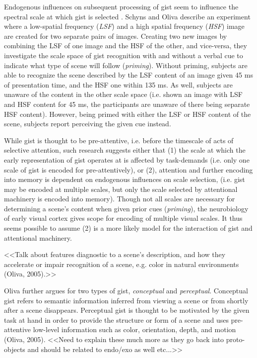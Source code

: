 \documentclass[a4paper,10pt,final]{ThesisStyle}
\begin{document}
Endogenous influences on subsequent processing of gist seem to influence the spectral scale at which gist is selected \cite{Schyns1994,Oliva1997}.  Schyns and Oliva describe an experiment where a low-spatial frequency (\textit{LSF}) and a high spatial frequency (\textit{HSF}) image are created for two separate pairs of images.  Creating two new images by combining the LSF of one image and the HSF of the other, and vice-versa, they investigate the scale space of gist recognition with and without a verbal cue to indicate what type of scene will follow (\textit{priming}).  Without priming, subjects are able to recognize the scene described by the LSF content of an image given 45 ms of presentation time, and the HSF one within 135 ms.  As well, subjects are unaware of the content in the other scale space (i.e. shown an image with LSF and HSF content for 45 ms, the participants are unaware of there being separate HSF content).  However, being primed with either the LSF or HSF content of the scene, subjects report perceiving the given cue instead.  

While gist is thought to be pre-attentive, i.e. before the timescale of acts of selective attention, such research suggests either that (1) the scale at which the early representation of gist operates at is affected by task-demands (i.e. only one scale of gist is encoded for pre-attentively), or (2), attention and further encoding into memory is dependent on endogenous influences on scale selection, (i.e. gist may be encoded at multiple scales, but only the scale selected by attentional machinery is encoded into memory).  Though not all scales are necessary for determining a scene's content when given prior cues (\textit{priming}), the neurobiology of early visual cortex gives scope for encoding of multiple visual scales.  It thus seems possible to assume (2) is a more likely model for the interaction of gist and attentional machinery.

<<Talk about features diagnostic to a scene's description, and how they accelerate or impair recognition of a scene, e.g. color in natural environments (Oliva, 2005).>>

Oliva further argues for two types of gist, \textit{conceptual} and \textit{perceptual}.  Conceptual gist refers to semantic information inferred from viewing a scene or from shortly after a scene disappears. Perceptual gist is thought to be motivated by the given task at hand in order to provide the structure or form of a scene and uses pre-attentive low-level information such as color, orientation, depth, and motion (Oliva, 2005).  <<Need to explain these much more as they go back into proto-objects and should be related to endo/exo as well etc...>>
	
\end{document}
